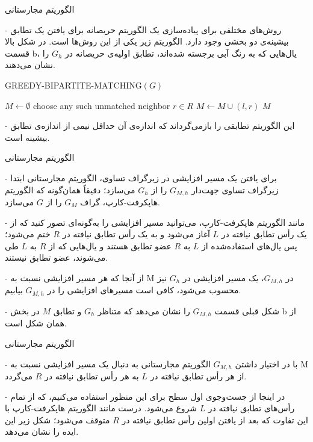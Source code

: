 \begin{itemframe}{الگوریتم مجارستانی}
\item[-]
روش‌های مختلفی برای پیاده‌سازی یک الگوریتم حریصانه برای یافتن یک تطابق بیشینه‌ی دو بخشی وجود دارد. الگوریتم زیر یکی از این روش‌ها است. در شکل بالا قسمت b، یال‌هایی که به رنگ آبی برجسته شده‌اند، تطابق اولیه‌ی حریصانه در $G_h$ را نشان می‌دهند.
\begin{algorithm}[H]\alglr
  \caption{\textsc{GREEDY-BIPARTITE-MATCHING}$(G)$}
  \begin{algorithmic}[1]
    \State $M \gets \emptyset$
        \State choose any such unmatched neighbor $r \in R$
        \State $M \gets M \cup {(l, r)}$
      \EndIf
    \EndFor
    \State \Return $M$
  \end{algorithmic}
\end{algorithm}
\item[-]
این الگوریتم تطابقی را بازمی‌گرداند که اندازه‌ی آن حداقل نیمی از اندازه‌ی تطابق بیشینه است.
\end{itemframe}


\begin{itemframe}{الگوریتم مجارستانی}
\item[-]
برای یافتن یک مسیر افزایشی در زیرگراف تساوی، الگوریتم مجارستانی ابتدا زیرگراف تساوی جهت‌دار $G_{M,h}$ را از $G_h$ می‌سازد؛ دقیقاً همان‌گونه که الگوریتم هاپکرفت-کارپ، گراف $G_M$ را از $G$ می‌سازد.
\item[-]
مانند الگوریتم هاپکرفت-کارپ، می‌توانید مسیر افزایشی را به‌گونه‌ای تصور کنید که از یک رأس تطابق نیافته در $L$ آغاز می‌شود و به یک رأس تطابق نیافته در $R$ ختم می‌شود؛ پس یال‌های استفاده‌شده از $L$ به $R$ عضو تطابق هستند و یال‌هایی که از $R$ به $L$ طی می‌شوند، عضو تطابق نیستند.
\item[-]
از آنجا که هر مسیر افزایشی نسبت به M در $G_{M,h}$، یک مسیر افزایشی در $G_h$ نیز محسوب می‌شود، کافی است مسیرهای افزایشی را در $G_{M,h}$ بیابیم.
\item[-]
شکل قبلی قسمت $G_{M,h}$ را نشان می‌دهد که متناظر $G_h$ و تطابق $M$ در بخش b از همان شکل است.
\end{itemframe}


\begin{itemframe}{الگوریتم مجارستانی}
\decLineSpace[0mm]
\item[-]
با در اختیار داشتن $G_{M,h}$ الگوریتم مجارستانی به دنبال یک مسیر افزایشی نسبت به M از هر رأس تطابق نیافته در $L$ به هر رأس تطابق نیافته در $R$ می‌گردد.
\item[-]
در اینجا از جست‌وجوی اول سطح برای این منظور استفاده می‌کنیم، که از تمام رأس‌های تطابق نیافته در $L$ شروع می‌شود. درست مانند الگوریتم هاپکرفت-کارپ با این تفاوت که بعد از یافتن اولین رأس تطابق نیافته در $R$ متوقف می‌شود؛ شکل زیر این ایده را نشان می‌دهد.

\end{itemframe}


